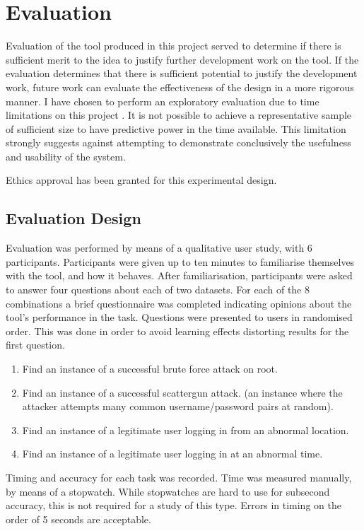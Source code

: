 \chapter{Evaluation}\label{eval}

Evaluation of the tool produced in this project served to determine if there is sufficient merit to the idea to justify further development work on the tool. If the evaluation determines that there is sufficient potential to justify the development work, future work can evaluate the effectiveness of the design in a more rigorous manner. I have chosen to perform an exploratory evaluation due to time limitations on this project \cite{Ellis:2006:EAU:1168149.1168152}. It is not possible to achieve a representative sample of sufficient size to have predictive power in the time available. This limitation strongly suggests against attempting to demonstrate conclusively the usefulness and usability of the system. 

Ethics approval has been granted for this experimental design.

\section{Evaluation Design}

Evaluation was performed by means of a qualitative user study, with 6 participants. 
Participants were given up to ten minutes to familiarise themselves with the tool, and how it behaves. After familiarisation, participants were asked to answer four questions about each of two datasets. For each of the 8 combinations a brief questionnaire was completed indicating opinions about the tool's performance in the task\cite{lewis1995ibm}.
Questions were presented to users in randomised order. This was done in order to avoid learning effects distorting results for the first question.
\begin{enumerate}
\item{Find an instance of a successful brute force attack on root.}
\item{Find an instance of a successful scattergun attack.
(an instance where the attacker attempts many common username/password pairs at random).}
\item{Find an instance of a legitimate user logging in from an abnormal location.}
\item{Find an instance of a legitimate user logging in at an abnormal time.}
\end{enumerate}

Timing and accuracy for each task was recorded. 
Time was measured manually, by means of a stopwatch. While stopwatches are hard to use for subsecond accuracy, this is not required for a study of this type. Errors in timing on the order of 5 seconds are acceptable.

